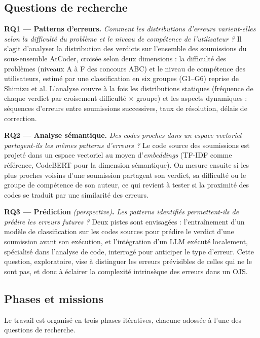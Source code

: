 \documentclass[11pt, a4paper]{article}
\begin{document}
\subsection{Questions de recherche}

\textbf{RQ1 --- Patterns d'erreurs.} \textit{Comment les distributions
d'erreurs varient-elles selon la difficulté du problème et le niveau de
compétence de l'utilisateur ?} Il s'agit d'analyser la distribution des
verdicts sur l'ensemble des soumissions du sous-ensemble AtCoder, croisée
selon deux dimensions : la difficulté des problèmes (niveaux A à F des
concours ABC) et le niveau de compétence des utilisateurs, estimé par une
classification en six groupes (G1--G6) reprise de Shimizu et al. L'analyse
couvre à la fois les distributions statiques (fréquence de chaque verdict par
croisement difficulté $\times$ groupe) et les aspects dynamiques : séquences
d'erreurs entre soumissions successives, taux de résolution, délais de
correction.

\textbf{RQ2 --- Analyse sémantique.} \textit{Des codes proches dans un espace
vectoriel partagent-ils les mêmes patterns d'erreurs ?} Le code source des
soumissions est projeté dans un espace vectoriel au moyen
d'\textit{embeddings} (TF-IDF comme référence, CodeBERT pour la dimension
sémantique). On mesure ensuite si les plus proches voisins d'une soumission
partagent son verdict, sa difficulté ou le groupe de compétence de son auteur, ce qui revient à tester si la proximité des codes se traduit par une similarité des erreurs.

\textbf{RQ3 --- Prédiction} \textit{(perspective)}\textbf{.} \textit{Les
patterns identifiés permettent-ils de prédire les erreurs futures ?} Deux
pistes sont envisagées : l'entraînement d'un modèle de classification sur les
codes sources pour prédire le verdict d'une soumission avant son exécution,
et l'intégration d'un LLM exécuté localement, spécialisé dans l'analyse de
code, interrogé pour anticiper le type d'erreur. Cette question, exploratoire,
vise à distinguer les erreurs prévisibles de celles qui ne le sont pas, et
donc à éclairer la complexité intrinsèque des erreurs dans un OJS.

\subsection{Phases et missions}

Le travail est organisé en trois phases itératives, chacune adossée à l'une
des questions de recherche.
\end{document}
